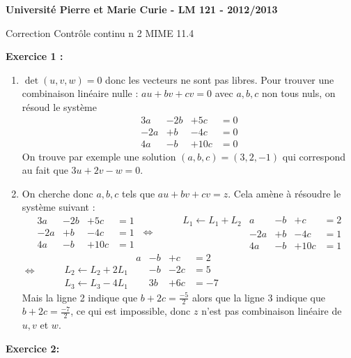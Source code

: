 \documentclass{article}
\begin{document}
\large
\noindent 
\textbf{Université Pierre et Marie Curie - LM 121 - 2012/2013}\\
\begin{center}
\Large 
Correction Contrôle continu n  2 MIME 11.4
\end{center}




\medskip
\noindent
\textbf{Exercice 1 :}\\

\begin{enumerate}
\item 
$\det(u,v,w)=0$ donc les vecteurs ne sont pas libres. 
Pour trouver une combinaison linéaire nulle : 
$au+bv +cv =0$ avec $a,b,c$ non tous nuls, on résoud le système 
\[ \begin{matrix}
3a &-2b & +5c & =0\\
-2a &+b & -4c & =0 \\
4a &-b & +10c & =0
\end{matrix}\]
On trouve par exemple une solution 
$(a,b,c) =(3,2,-1)$ qui correspond au fait que 
$3u+2v-w=0$.
\item 
On cherche donc $a,b,c$ tels que $au+bv+cv=z$. Cela amène à résoudre le système suivant :
\[
\begin{matrix}
3a &-2b & +5c & =1\\
-2a &+b & -4c & =1 \\
4a &-b & +10c & =1
\end{matrix}
\ \Leftrightarrow \hspace{1cm} 
\begin{matrix}
L_1\leftarrow L_1+L_2 &a &-b & +c & =2\\
 &-2a &+b & -4c & =1 \\
&4a &-b & +10c & =1
\end{matrix} \]
$
\Leftrightarrow \hspace{1cm} 
\begin{matrix}
 &a &-b & +c & =2\\
L_2 \leftarrow L_2 +2L_1  & & -b & -2c & =5 \\
L_3 \leftarrow L_3 -4L_1 & &3b & +6c & =-7
\end{matrix}
$ \\
Mais la ligne 2 indique que 
$b+2c = \frac{-5}{2}$ alors que la ligne 3 indique que 
$b+2c = \frac{-7}{2}$, ce qui est impossible, donc $z$ n'est pas combinaison linéaire de $u,v$ et $w$.
\end{enumerate}


\medskip
\noindent
\textbf{Exercice 2:}\\
\end{document}
